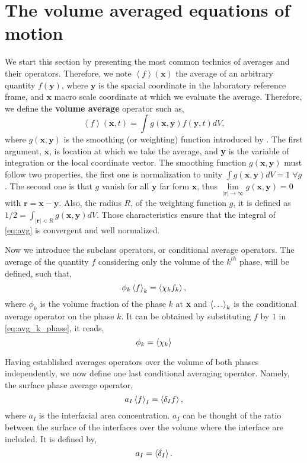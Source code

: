 
\section{The volume averaged equations of motion}

We start this section by presenting the most common technics of averages and their operators.
Therefore, we note $\left<f\right>(\textbf{x})$ the average of an arbitrary quantity $f(\textbf{y})$,
where $\textbf{y}$ is the spacial coordinate in the laboratory reference frame,
and $\textbf{x}$ macro scale coordinate at which we evaluate the average.
Therefore, we define the \textbf{volume average} operator such as,
\begin{equation}
    \left<f\right>(\textbf{x},t) = \int g(\textbf{x},\textbf{y}) f(\textbf{y},t)dV,
    \label{eq:avg}
\end{equation}
where $g(\textbf{x},\textbf{y})$ is the smoothing (or weighting) function introduced by
\citet{jackson1997locally,marle1982macroscopic}.
The first argument, $\textbf{x}$, is location at which we take the average, and \textbf{y} is the variable of integration or the local coordinate vector.
The smoothing function $g(\textbf{x},\textbf{y})$ must follow two properties, the first one is normalization to unity
$\int g(\textbf{x},\textbf{y}) dV = 1 \;\forall g$.
The second one is that $g$ vanish for all $\textbf{y}$ far form $\textbf{x}$, thus $\lim\limits_{|\textbf{r}| \to \infty} g(\textbf{x},\textbf{y}) = 0$ with $\textbf{r} = \textbf{x} - \textbf{y}$.
Also, the radius $R$, of the weighting function $g$, it is defined as $1/2 = \int_{|\textbf{r}|<R} g(\textbf{x},\textbf{y})dV$.
Those characteristics ensure that the integral of \ref{eq:avg} is convergent and well normalized.


Now we introduce the subclass operators, or conditional average operators.
The average of the quantity $f$ considering only the volume of the $k^{th}$ phase, will be defined, such that,
\begin{equation}
    \phi_k \left<f\right>_k
    = \left<\chi_k f_k\right>,
    \label{eq:avg_k_phase}
\end{equation}
where $\phi_k$ is the volume fraction of the phase $k$ at \textbf{x} and $\left<\ldots\right>_k$ is the conditional average operator on the phase $k$.
It can be obtained by substituting $f$ by $1$ in \ref{eq:avg_k_phase}, it reads,
\begin{equation*}
    \phi_k
    = \left<\chi_k\right>
\end{equation*}

Having established averages operators over the volume of both phases independently, we now define one last conditional averaging operator.
Namely, the surface phase average operator,
\begin{equation}
    a_I\left<f\right>_I
    = \left<\delta_I f\right>,
    \label{eq:avg_I_phase}
\end{equation}
where $a_I$ is the interfacial area concentration.
$a_I$ can be thought of the ratio between the surface of the interfaces over the volume where the interface are included.
It is defined by,
\begin{equation}
    a_I
    = \left<\delta_I\right>.
\end{equation}

